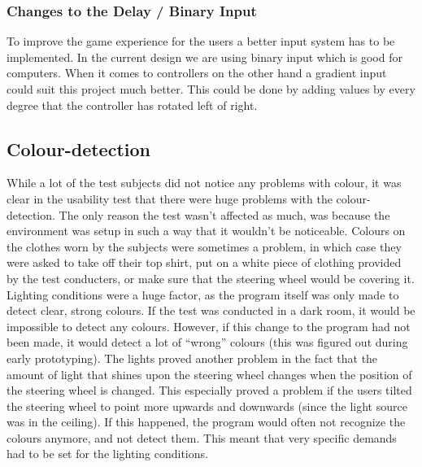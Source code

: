 \subsubsection*{Changes to the Delay / Binary Input}
To improve the game experience for the users a better input system has to be implemented. In the current design we are using binary input which is good for computers. When it comes to controllers on the other hand a gradient input could suit this project much better. This could be done by adding values by every degree that the controller has rotated left of right.


\subsection{Colour-detection}
While a lot of the test subjects did not notice any problems with colour, it was clear in the usability test that there were huge problems with the colour-detection. The only reason the test wasn’t affected as much, was because the environment was setup in such a way that it wouldn’t be noticeable.
Colours on the clothes worn by the subjects were sometimes a problem, in which case they were asked to take off their top shirt, put on a white piece of clothing provided by the test conducters, or make sure that the steering wheel would be covering it.
Lighting conditions were a huge factor, as the program itself was only made to detect clear, strong colours. If the test was conducted in a dark room, it would be impossible to detect any colours. However, if this change to the program had not been made, it would detect a lot of “wrong” colours (this was figured out during early prototyping).
The lights proved another problem in the fact that the amount of light that shines upon the steering wheel changes when the position of the steering wheel is changed. This especially proved a problem if the users tilted the steering wheel to point more upwards and downwards (since the light source was in the ceiling). If this happened, the program would often not recognize the colours anymore, and not detect them. This meant that very specific demands had to be set for the lighting conditions.

